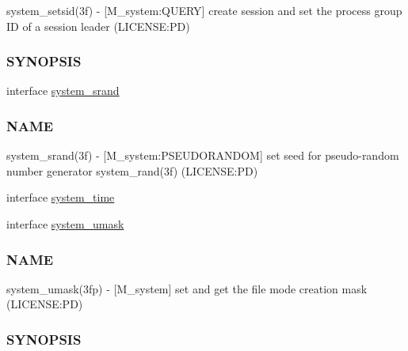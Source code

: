 \begin{DoxyCompactItemize}
\begin{DoxyCompactList}
system\+\_\+setsid(3f) -\/ \mbox{[}M\+\_\+system\+:Q\+U\+E\+RY\mbox{]} create session and set the process group ID of a session leader (L\+I\+C\+E\+N\+SE\+:PD) \subsubsection*{S\+Y\+N\+O\+P\+S\+IS}\end{DoxyCompactList}\item 
interface \mbox{\hyperlink{interfacem__system_1_1system__srand}{system\+\_\+srand}}
\begin{DoxyCompactList}\small\item\em \subsubsection*{N\+A\+ME}

system\+\_\+srand(3f) -\/ \mbox{[}M\+\_\+system\+:P\+S\+E\+U\+D\+O\+R\+A\+N\+D\+OM\mbox{]} set seed for pseudo-\/random number generator system\+\_\+rand(3f) (L\+I\+C\+E\+N\+SE\+:PD) \end{DoxyCompactList}\item 
interface \mbox{\hyperlink{interfacem__system_1_1system__time}{system\+\_\+time}}
\item 
interface \mbox{\hyperlink{interfacem__system_1_1system__umask}{system\+\_\+umask}}
\begin{DoxyCompactList}\small\item\em \subsubsection*{N\+A\+ME}

system\+\_\+umask(3fp) -\/ \mbox{[}M\+\_\+system\mbox{]} set and get the file mode creation mask (L\+I\+C\+E\+N\+SE\+:PD) \subsubsection*{S\+Y\+N\+O\+P\+S\+IS}\end{DoxyCompactList}\end{DoxyCompactItemize}
